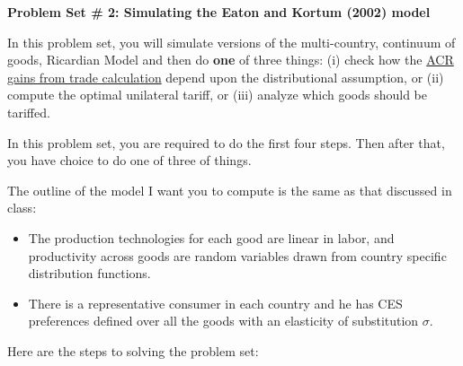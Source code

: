 \documentclass[pdftex,11pt]{article}
\begin{document}
\centerline{ \large \textbf{Problem Set \# 2: Simulating the Eaton and Kortum (2002) model}}

\bigskip

In this problem set, you will simulate versions of the multi-country, continuum of goods, Ricardian Model and then do \textbf{one} of three things: (i) check how the \href{https://www.aeaweb.org/articles?id=10.1257/aer.102.1.94}{ACR gains from trade calculation} depend upon the distributional assumption, or (ii) compute the optimal unilateral tariff, or (iii) analyze which goods should be tariffed.

In this problem set, you are required to do the first four steps. Then after that, you have choice to do one of three of things.

The outline of the model I want you to compute is the same as that discussed in class:
\begin{itemize}
\item The production technologies for each good are linear in labor, and productivity across goods are random variables drawn from country specific distribution functions.

\item There is a representative consumer in each country and he has CES preferences defined over all the goods with an elasticity of substitution $\sigma$.
\end{itemize}
Here are the steps to solving the problem set:
\end{document}
